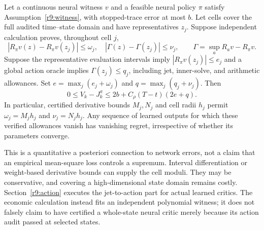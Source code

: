 \begin{theorem}\label{r9:bridge}
Let a continuous neural witness $v$ and a feasible neural policy $\pi$ satisfy Assumption~\ref{r9:witness}, with stopped-trace error at most $b$. Let cells cover the full audited time--state domain and have representatives $z_j$. Suppose independent calculation proves, throughout cell $j$,
\[
 |R_\pi v(z)-R_\pi v(z_j)|\leq\omega_j,
 \quad |\Gamma(z)-\Gamma(z_j)|\leq\nu_j,
 \qquad \Gamma=\sup_aR_av-R_\pi v.
\]
Suppose the representative evaluation intervals imply $|R_\pi v(z_j)|\leq e_j$ and a global action oracle implies $\Gamma(z_j)\leq q_j$, including jet, inner-solve, and arithmetic allowances. Set $e=\max_j(e_j+\omega_j)$ and $q=\max_j(q_j+\nu_j)$. Then
\begin{equation}
 0\leq V_k-J_k^\pi\leq 2b+C_\rho(T-t)(2e+q).\label{r9:bridgebound}
\end{equation}
In particular, certified derivative bounds $M_j,N_j$ and cell radii $h_j$ permit $\omega_j=M_jh_j$ and $\nu_j=N_jh_j$. Any sequence of learned outputs for which these verified allowances vanish has vanishing regret, irrespective of whether its parameters converge.
\end{theorem}
This is a quantitative a posteriori connection to network errors, not a claim that an empirical mean-square loss controls a supremum. Interval differentiation or weight-based derivative bounds can supply the cell moduli. They may be conservative, and covering a high-dimensional state domain remains costly. Section~\ref{r9:action} executes the jet-to-action part for actual learned critics. The economic calculation instead fits an independent polynomial witness; it does not falsely claim to have certified a whole-state neural critic merely because its action audit passed at selected states.



